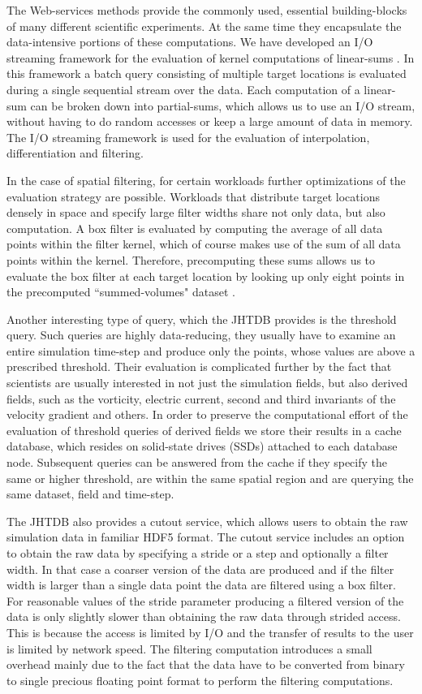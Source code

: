 \documentclass[10pt,twocolumn]{article}
\begin{document}
The Web-services methods provide the commonly used, essential building-blocks of many different scientific experiments. At the same time they
encapsulate the data-intensive portions of these computations. We have developed an I/O streaming framework for the evaluation of kernel computations of
linear-sums \cite{KanovSC11}. In this framework a batch query consisting of multiple target locations is evaluated during a single sequential stream over 
the data. Each computation of a linear-sum can be broken down into partial-sums, which allows us to use an I/O stream, without having to do random 
accesses or keep a large amount of data in memory. The I/O streaming framework is used for the evaluation of interpolation, differentiation and filtering.

In the case of spatial filtering, for certain workloads further optimizations of the evaluation strategy are possible. Workloads that distribute target locations
densely in space and specify large filter widths share not only data, but also computation. A box filter is evaluated by computing the average of all data
points within the filter kernel, which of course makes use of the sum of all data points within the kernel. Therefore, precomputing these sums allows us to
evaluate the box filter at each target location by looking up only eight points in the precomputed ``summed-volumes" dataset \cite{KanovSC12}.

Another interesting type of query, which the JHTDB provides is the threshold query. Such queries are highly data-reducing, they usually have to examine an
entire simulation time-step and produce only the points, whose values are above a prescribed threshold. Their evaluation is complicated further by the fact
that scientists are usually interested in not just the simulation fields, but also derived fields, such as the vorticity, electric current, second and third invariants
of the velocity gradient and others. In order to preserve the computational effort of the evaluation of threshold queries of derived fields we store their results
in a cache database, which resides on solid-state drives (SSDs) attached to each database node. Subsequent queries can be answered from the cache
if they specify the same or higher threshold, are within the same spatial region and are querying the same dataset, field and time-step.

The JHTDB also provides a cutout service, which allows users to obtain the raw simulation data in familiar HDF5 format. The cutout service includes an
option to obtain the raw data by specifying a stride or a step and optionally a filter width. 
In that case a coarser version of the data are produced and if the filter width is larger than a single data point the data are filtered using a box filter. 
For reasonable values of the stride parameter producing a filtered version of the data is only slightly slower than obtaining the raw data through strided access.  
This is because the access is limited by I/O and the transfer of results to the user is limited by network speed. 
The filtering computation introduces a small overhead mainly due to the fact that the data have to be converted
from binary to single precious floating point format to perform the filtering computations.
\end{document}
